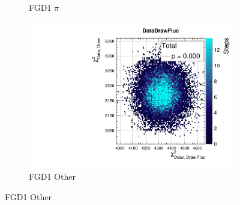 \begin{figure}[h]
\begin{subfigure}[t]{0.32\textwidth}
		\caption{FGD1 $\pi$}
	\end{subfigure}
	\begin{subfigure}[t]{0.32\textwidth}
		\includegraphics[width=\textwidth, trim={20mm 6mm 4mm 11mm}, clip,page=79]{figures/mach3/2018/data/2018a_FixedCov_RedCov_Mpi_Data_merge_PostPredStore_FullLLH_procs}
		\caption{FGD1 \numubar Other}
	\end{subfigure}
	

\end{figure}

